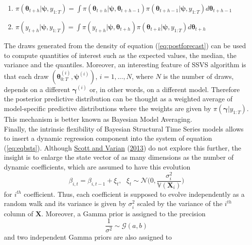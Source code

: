 \documentclass[
  12pt,
]{book}
\theoremstyle{break}
\theoremstyle{nonumberplain}
\begin{document}
\begin{enumerate}[label=(\roman*)]
\item $\pi(\boldsymbol{\theta}_{t+h}|\boldsymbol{\psi},y_{1:T})=\int \pi(\boldsymbol{\theta}_{t+h}|\boldsymbol{\psi},\boldsymbol{\theta}_{t+h-1})\pi(\boldsymbol{\theta}_{t+h-1}|\boldsymbol{\psi},y_{1:T}) d\boldsymbol{\theta}_{t+h-1}$
\item $\pi(y_{t+h}|\boldsymbol{\psi}, y_{1:T})=\int \pi(y_{t+h}|\boldsymbol{\psi},\boldsymbol{\theta}_{t+h})\pi(\boldsymbol{\theta}_{t+k}|\boldsymbol{\psi},y_{1:T}) d\boldsymbol{\theta}_{t+h}$
\end{enumerate}

The draws generated from the density of equation (\ref{eq:postforecast})
can be used to compute quantities of interest such as the expected
values, the median, the variance and the quantiles. Moreover, an
interesting feature of SSVS algorithm is that each draw
\((\boldsymbol{\theta}_{0:T}^{(i)},\boldsymbol{\psi}^{(i)})\),
\(i=1,...,N\), where \(N\) is the number of draws, depends on a
different \(\boldsymbol{\gamma}^{(i)}\) or, in other words, on a
different model. Therefore the posterior predictive distribution can be
thought as a weighted average of model-specific predictive distributions
where the weights are given by \(\pi(\boldsymbol{\gamma}|y_{1:T})\).
This mechanism is better known as Bayesian Model Averaging.\\
Finally, the intrinsic flexibility of Bayesian Structural Time Series
models allows to insert a dynamic regression component into the system
of equation (\ref{eq:eqbsts}). Although
\protect\hyperlink{ref-scott_varian_2013}{Scott and Varian}
(\protect\hyperlink{ref-scott_varian_2013}{2013}) do not explore this
further, the insight is to enlarge the state vector of as many
dimensions as the number of dynamic coefficients, which are assumed to
have this evolution \begin{equation*}
\beta_{i,t}=\beta_{i,t-1}+\xi_{t}, \ \ \ \xi_{t}\sim \mathcal{N}\bigg(0,\frac{\sigma_{i}^{2}}{\mathbb V(\boldsymbol{X}_{i})}\bigg) 
\end{equation*} for \(i^{th}\) coefficient. Thus, each coefficient is
supposed to evolve independently as a random walk and its variance is
given by \(\sigma^{2}_{i}\) scaled by the variance of the \(i^{th}\)
column of \(\boldsymbol{X}\). Moreover, a Gamma prior is assigned to the
precision \begin{equation*}
\frac{1}{\sigma^{2}}\sim \mathcal{G}(a,b) 
\end{equation*} and two independent Gamma priors are also assigned to
\end{document}

